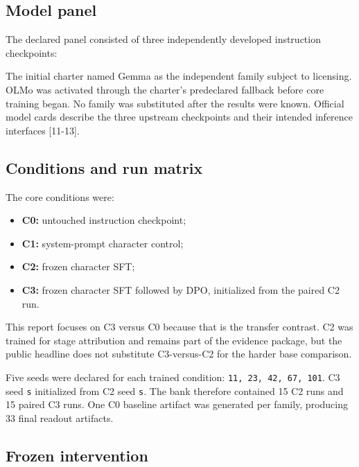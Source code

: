 \documentclass[9pt,letterpaper,twocolumn]{extarticle}
\providecommand{\tightlist}{\setlength{\itemsep}{0pt}\setlength{\parskip}{0pt}}
\begin{document}
\subsection{Model panel}\label{model-panel}

The declared panel consisted of three independently developed
instruction checkpoints:



The initial charter named Gemma as the independent family subject to
licensing. OLMo was activated through the charter's predeclared fallback
before core training began. No family was substituted after the results
were known. Official model cards describe the three upstream checkpoints
and their intended inference interfaces {[}11-13{]}.

\subsection{Conditions and run matrix}\label{conditions-and-run-matrix}

The core conditions were:

\begin{itemize}
\tightlist
\item
  \textbf{C0:} untouched instruction checkpoint;
\item
  \textbf{C1:} system-prompt character control;
\item
  \textbf{C2:} frozen character SFT;
\item
  \textbf{C3:} frozen character SFT followed by DPO, initialized from
  the paired C2 run.
\end{itemize}

This report focuses on C3 versus C0 because that is the transfer
contrast. C2 was trained for stage attribution and remains part of the
evidence package, but the public headline does not substitute
C3-versus-C2 for the harder base comparison.

Five seeds were declared for each trained condition:
\texttt{11,\ 23,\ 42,\ 67,\ 101}. C3 seed \texttt{s} initialized from C2
seed \texttt{s}. The bank therefore contained 15 C2 runs and 15 paired
C3 runs. One C0 baseline artifact was generated per family, producing 33
final readout artifacts.

\subsection{Frozen intervention}\label{frozen-intervention}
\end{document}
